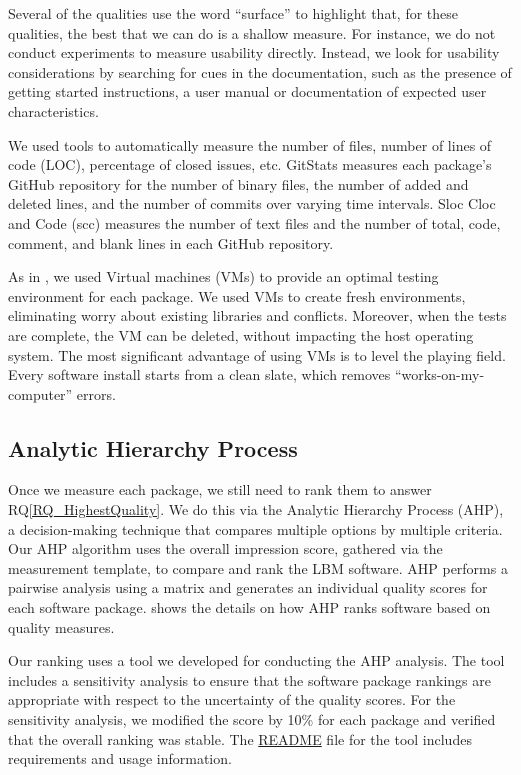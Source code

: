 \documentclass[final, 3p, times, authoryear]{elsarticle}
\newcommand{\rqref}[1]{RQ\ref{#1}}
\begin{document}
Several of the qualities use the word ``surface'' to highlight that, for these
qualities, the best that we can do is a shallow measure. For instance, we do not
conduct experiments to measure usability directly. Instead, we look for
usability considerations by searching for cues in the documentation, such as the
presence of getting started instructions, a user manual or documentation of
expected user characteristics. 

We used tools to automatically measure the number of files, number of lines of
code (LOC), percentage of closed issues, etc. GitStats measures each package's
GitHub repository for the number of binary files, the number of added and
deleted lines, and the number of commits over varying time intervals. Sloc Cloc
and Code (scc) measures the number of text files and the number of total, code,
comment, and blank lines in each GitHub repository. 

As in \citet{SmithEtAl2016}, we used Virtual machines (VMs) to provide an
optimal testing environment for each package. We used VMs to create fresh
environments, eliminating worry about existing libraries and conflicts.
Moreover, when the tests are complete, the VM can be deleted, without impacting
the host operating system. The most significant advantage of using VMs is to
level the playing field. Every software install starts from a clean slate, which
removes ``works-on-my-computer'' errors.

\subsection{Analytic Hierarchy Process} \label{AHP}

Once we measure each package, we still need to rank them to answer
\rqref{RQ_HighestQuality}. We do this via the Analytic Hierarchy Process (AHP),
a decision-making technique that compares multiple options by multiple criteria.
Our AHP algorithm uses the overall impression score, gathered via the
measurement template, to compare and rank the LBM software. AHP performs a
pairwise analysis using a matrix and generates an individual quality scores for
each software package. \citet{SmithEtAl2016} shows the details on how AHP ranks
software based on quality measures.

Our ranking uses a tool we developed for conducting the AHP analysis. The tool
includes a sensitivity analysis to ensure that the software package rankings are
appropriate with respect to the uncertainty of the quality scores. For the
sensitivity analysis, we modified the score by 10\% for each package and
verified that the overall ranking was stable.  The
\href{https://github.com/smiths/AIMSS/blob/master/StateOfPractice/AHP2020/LBM/README.txt}{README}
file for the tool includes requirements and usage information.
\end{document}
